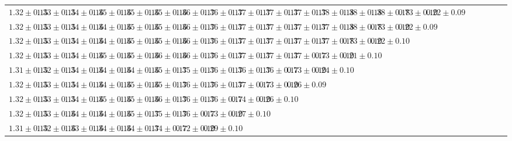 \begin{table}[ht]
{{\begin{adjustbox}{width=\textwidth}
\begin{tabular}{ccccccccccccccccccccccc}
$1.32 \pm 0.15$ & $1.33 \pm 0.15$ & $1.34 \pm 0.16$ & $1.35 \pm 0.16$ & $1.35 \pm 0.16$ & $1.35 \pm 0.16$ & $1.36 \pm 0.17$ & $1.36 \pm 0.17$ & $1.37 \pm 0.17$ & $1.37 \pm 0.17$ & $1.37 \pm 0.17$ & $1.38 \pm 0.18$ & $1.38 \pm 0.18$ & $1.38 \pm 0.18$ & $0.73 \pm 0.10$ & $0.22 \pm 0.09$ &  &  &  &  &  &  &  \\
$1.32 \pm 0.15$ & $1.33 \pm 0.15$ & $1.34 \pm 0.16$ & $1.34 \pm 0.16$ & $1.35 \pm 0.16$ & $1.35 \pm 0.16$ & $1.36 \pm 0.17$ & $1.36 \pm 0.17$ & $1.37 \pm 0.17$ & $1.37 \pm 0.17$ & $1.37 \pm 0.17$ & $1.37 \pm 0.18$ & $1.38 \pm 0.18$ & $0.73 \pm 0.10$ & $0.22 \pm 0.09$ &  &  &  &  &  &  &  &  \\
$1.32 \pm 0.15$ & $1.33 \pm 0.15$ & $1.34 \pm 0.16$ & $1.34 \pm 0.16$ & $1.35 \pm 0.16$ & $1.35 \pm 0.16$ & $1.36 \pm 0.17$ & $1.36 \pm 0.17$ & $1.37 \pm 0.17$ & $1.37 \pm 0.17$ & $1.37 \pm 0.17$ & $1.37 \pm 0.18$ & $0.73 \pm 0.10$ & $0.22 \pm 0.10$ &  &  &  &  &  &  &  &  &  \\
$1.32 \pm 0.15$ & $1.33 \pm 0.15$ & $1.34 \pm 0.16$ & $1.35 \pm 0.16$ & $1.35 \pm 0.16$ & $1.36 \pm 0.16$ & $1.36 \pm 0.17$ & $1.36 \pm 0.17$ & $1.37 \pm 0.17$ & $1.37 \pm 0.17$ & $1.37 \pm 0.17$ & $0.73 \pm 0.10$ & $0.21 \pm 0.10$ &  &  &  &  &  &  &  &  &  &  \\
$1.31 \pm 0.15$ & $1.32 \pm 0.15$ & $1.34 \pm 0.16$ & $1.34 \pm 0.16$ & $1.34 \pm 0.16$ & $1.35 \pm 0.17$ & $1.35 \pm 0.17$ & $1.36 \pm 0.17$ & $1.36 \pm 0.17$ & $1.36 \pm 0.17$ & $0.73 \pm 0.10$ & $0.24 \pm 0.10$ &  &  &  &  &  &  &  &  &  &  &  \\
$1.32 \pm 0.15$ & $1.33 \pm 0.15$ & $1.34 \pm 0.16$ & $1.34 \pm 0.16$ & $1.35 \pm 0.16$ & $1.35 \pm 0.17$ & $1.36 \pm 0.17$ & $1.36 \pm 0.17$ & $1.37 \pm 0.17$ & $0.73 \pm 0.10$ & $0.26 \pm 0.09$ &  &  &  &  &  &  &  &  &  &  &  &  \\
$1.32 \pm 0.15$ & $1.33 \pm 0.15$ & $1.34 \pm 0.16$ & $1.35 \pm 0.16$ & $1.35 \pm 0.16$ & $1.36 \pm 0.17$ & $1.36 \pm 0.17$ & $1.36 \pm 0.17$ & $0.74 \pm 0.10$ & $0.26 \pm 0.10$ &  &  &  &  &  &  &  &  &  &  &  &  &  \\
$1.32 \pm 0.15$ & $1.33 \pm 0.16$ & $1.34 \pm 0.16$ & $1.34 \pm 0.16$ & $1.35 \pm 0.17$ & $1.35 \pm 0.17$ & $1.36 \pm 0.17$ & $0.73 \pm 0.10$ & $0.27 \pm 0.10$ &  &  &  &  &  &  &  &  &  &  &  &  &  &  \\
$1.31 \pm 0.15$ & $1.32 \pm 0.16$ & $1.33 \pm 0.16$ & $1.34 \pm 0.16$ & $1.34 \pm 0.17$ & $1.34 \pm 0.17$ & $0.72 \pm 0.10$ & $0.29 \pm 0.10$ &  &  &  &  &  &  &  &  &  &  &  &  &  &  &  \\

\end{tabular}
\end{adjustbox}}}
\end{table}
